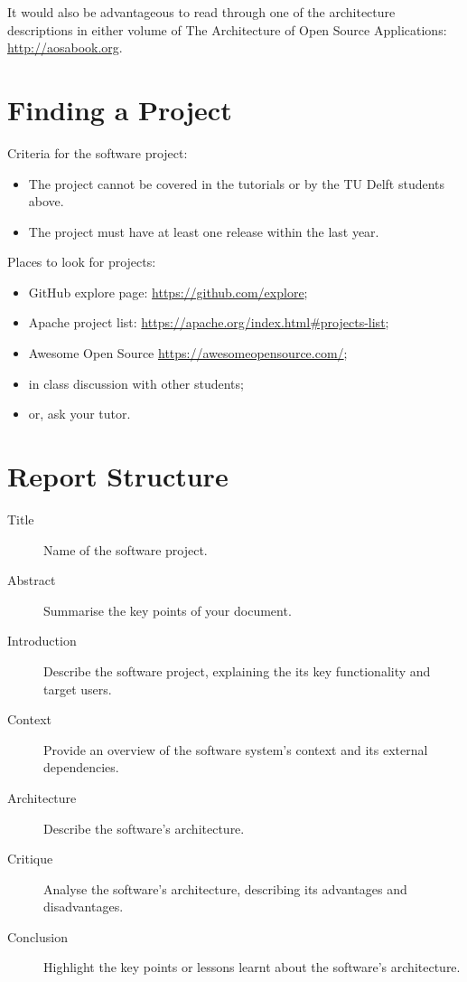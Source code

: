 \documentclass{csse4400}
\begin{document}
It would also be advantageous to read through one of the architecture descriptions in either volume of
The Architecture of Open Source Applications: \url{http://aosabook.org}.

\section{Finding a Project}
Criteria for the software project:
\begin{itemize}
    \item The project cannot be covered in the tutorials or by the TU Delft students above.
    \item The project must have at least one release within the last year.
\end{itemize}

\noindent%
 Places to look for projects:
\begin{itemize}
    \item GitHub explore page: \url{https://github.com/explore};
    \item Apache project list: \url{https://apache.org/index.html#projects-list};
    \item Awesome Open Source \url{https://awesomeopensource.com/};
    \item in class discussion with other students;
    \item or, ask your tutor.
\end{itemize}

\section{Report Structure}

\begin{description}
    \item[Title] Name of the software project.
    \item[Abstract] Summarise the key points of your document.
    \item[Introduction] Describe the software project, explaining the its key functionality and target users.
    \item[Context] Provide an overview of the software system's context and its external dependencies.
    \item[Architecture] Describe the software's architecture.
    \item[Critique] Analyse the software's architecture, describing its advantages and disadvantages.
    \item[Conclusion] Highlight the key points or lessons learnt about the software's architecture.
\end{description}
\end{document}
